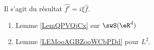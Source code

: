 
      \label{THEMEooJREIooKEdMOl}
Il s'agit du résultat \( \hat{f'}=i\xi \hat{f}\).
\begin{enumerate}
    \item
        Lemme \ref{LemQPVQjCx} sur \( \swS(\eR^d)\)
    \item
        Lemme \ref{LEMooAGBZooWCbPDd} pour \( L^2\).
\end{enumerate}

